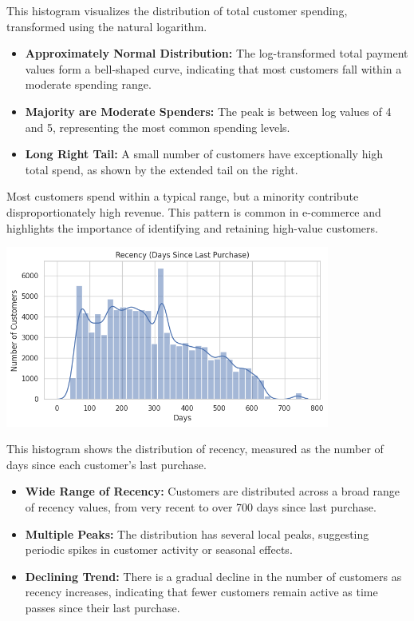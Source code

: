 \documentclass[a4paper]{article}
\begin{document}
\begin{multicols}{2}
This histogram visualizes the distribution of total customer spending, transformed using the natural logarithm.

\begin{itemize}
    \item \textbf{Approximately Normal Distribution:} The log-transformed total payment values form a bell-shaped curve, indicating that most customers fall within a moderate spending range.
    \item \textbf{Majority are Moderate Spenders:} The peak is between log values of 4 and 5, representing the most common spending levels.
    \item \textbf{Long Right Tail:} A small number of customers have exceptionally high total spend, as shown by the extended tail on the right.
\end{itemize}

Most customers spend within a typical range, but a minority contribute disproportionately high revenue. This pattern is common in e-commerce and highlights the importance of identifying and retaining high-value customers.

\vspace{1em}

\noindent
\begin{minipage}{\columnwidth}
\centering
\includegraphics[width=0.8\textwidth]{plots/Recency (Days Since Last Purchase).png}
\label{fig:recency_days}
\end{minipage}

This histogram shows the distribution of recency, measured as the number of days since each customer’s last purchase.

\begin{itemize}
    \item \textbf{Wide Range of Recency:} Customers are distributed across a broad range of recency values, from very recent to over 700 days since last purchase.
    \item \textbf{Multiple Peaks:} The distribution has several local peaks, suggesting periodic spikes in customer activity or seasonal effects.
    \item \textbf{Declining Trend:} There is a gradual decline in the number of customers as recency increases, indicating that fewer customers remain active as time passes since their last purchase.
\end{itemize}


\end{multicols}
\end{document}
